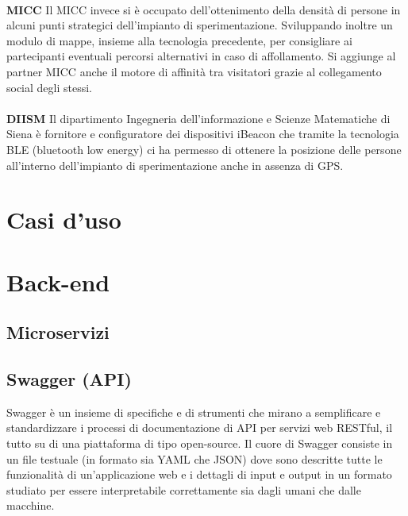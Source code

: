 \paragraph{}

\textbf{MICC}
Il MICC invece si è occupato dell’ottenimento della densità di persone in alcuni punti strategici dell’impianto di sperimentazione. Sviluppando inoltre un modulo di mappe, insieme alla tecnologia precedente, per consigliare ai partecipanti eventuali percorsi alternativi in caso di affollamento.
Si aggiunge al partner MICC anche il motore di affinità tra visitatori grazie al collegamento social degli stessi.
\paragraph{}

\textbf{DIISM}
Il dipartimento Ingegneria dell’informazione e Scienze Matematiche di Siena è fornitore e configuratore dei dispositivi iBeacon che tramite la tecnologia BLE (bluetooth low energy) ci ha permesso di ottenere la posizione delle persone all’interno dell’impianto di sperimentazione anche in assenza di GPS.
\paragraph{}

\section{Casi d'uso}
\section{Back-end}

\subsection{Microservizi}
\subsection{Swagger (API)}
Swagger è un insieme di specifiche e di strumenti che mirano a semplificare e
standardizzare i processi di documentazione di API per servizi web RESTful, il tutto su
di una piattaforma di tipo open-source.
Il cuore di Swagger consiste in un file testuale (in formato sia YAML che JSON) dove
sono descritte tutte le funzionalità di un’applicazione web e i dettagli di input e output
in un formato studiato per essere interpretabile correttamente sia dagli umani che
dalle macchine.
